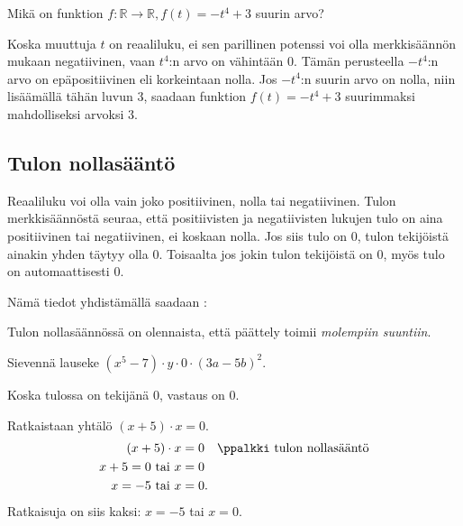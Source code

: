 \begin{esimerkki}
Mikä on funktion $f:\mathbb{R} \rightarrow \mathbb{R}, f(t)=-t^4+3$ suurin arvo?
    \begin{esimratk}
Koska muuttuja $t$ on reaaliluku, ei sen parillinen potenssi voi olla merkkisäännön mukaan negatiivinen, vaan $t^4$:n arvo on vähintään $0$. Tämän perusteella $-t^4$:n arvo on epäpositiivinen eli korkeintaan nolla. Jos $-t^4$:n suurin arvo on nolla, niin lisäämällä tähän luvun $3$, saadaan funktion $f(t)=-t^4+3$ suurimmaksi mahdolliseksi arvoksi $3$.
    \end{esimratk}
\end{esimerkki}

\subsection*{Tulon nollasääntö}

Reaaliluku voi olla vain joko positiivinen, nolla tai negatiivinen. Tulon merkkisäännöstä seuraa, että positiivisten ja negatiivisten lukujen tulo on aina positiivinen tai negatiivinen, ei koskaan nolla. Jos siis tulo on $0$, tulon tekijöistä ainakin yhden täytyy olla $0$. Toisaalta jos jokin tulon tekijöistä on $0$, myös tulo on automaattisesti $0$.

Nämä tiedot yhdistämällä saadaan :


Tulon nollasäännössä on olennaista, että päättely toimii \emph{molempiin suuntiin}.

\begin{esimerkki}
Sievennä lauseke $(x^5-7)\cdot y \cdot 0\cdot(3a-5b)^2$.
    \begin{esimratk}
Koska tulossa on tekijänä $0$, vastaus on $0$.
    \end{esimratk}
\end{esimerkki}

\begin{esimerkki} Ratkaistaan yhtälö $(x+5) \cdot x =0 $.
    \begin{align*}
        (x+5)\cdot x &=0 \quad \ppalkki \text{ tulon nollasääntö} \\
        x +5= 0 \text{ tai } x &=0 \\
        x= -5 \text{ tai } x &=0.
    \end{align*}
    Ratkaisuja on siis kaksi: $x= -5$ tai $x= 0$.
\end{esimerkki}

